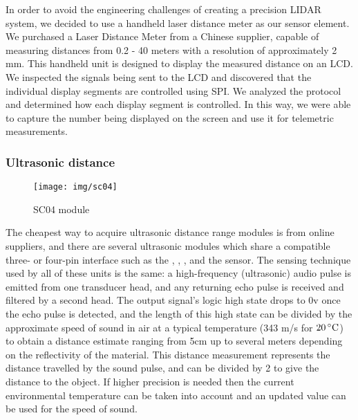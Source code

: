    In order to avoid the engineering challenges of creating a precision LIDAR system, we decided to use a handheld laser distance meter as our sensor element. We purchased a  Laser Distance Meter from a Chinese supplier, capable of measuring distances from 0.2 - 40 meters with a resolution of approximately 2 mm. This handheld unit is designed to display the measured distance on an LCD. We inspected the signals being sent to the LCD and discovered that the individual display segments are controlled using SPI. We analyzed the protocol and determined how each display segment is controlled. In this way, we were able to capture the number being displayed on the screen and use it for telemetric measurements.

    \subsubsection*{Ultrasonic distance}
    \begin{wrapfigure}{l}{0.28\textwidth}
        \centering
        \texttt{[image: img/sc04]}
        \caption*{SC04 module}
    \end{wrapfigure}
    The cheapest way to acquire ultrasonic distance range modules is from online suppliers, and there are several ultrasonic modules which share a compatible three- or four-pin interface such as the , , , and the  sensor. The sensing technique used by all of these units is the same: a high-frequency (ultrasonic) audio pulse is emitted from one transducer head, and any returning echo pulse is received and filtered by a second head. The output signal's logic high state drops to 0v once the echo pulse is detected, and the length of this high state can be divided by the approximate speed of sound in air at a typical temperature (343 m/s for $20\,^{\circ}\mathrm{C}{}$) to obtain a distance estimate ranging from 5cm up to several meters depending on the reflectivity of the material. This distance measurement represents the distance travelled by the sound pulse, and can be divided by 2 to give the distance to the object. If higher precision is needed then the current environmental temperature can be taken into account and an updated value can be used for the speed of sound.

